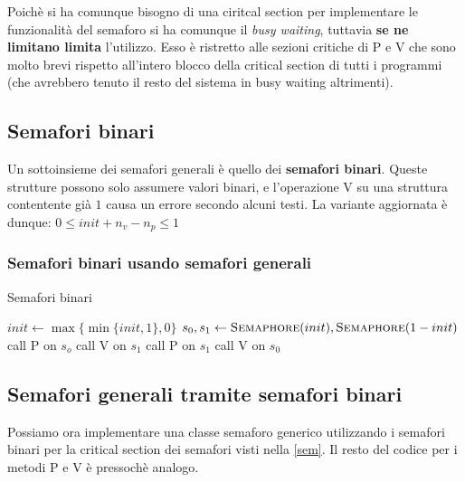 \documentclass{article}
\begin{document}
Poich\`e si ha comunque bisogno di una ciritcal section per implementare le
funzionalit\`a del semaforo si ha comunque il \emph{busy waiting}, tuttavia \textbf{se
ne limitano limita} l'utilizzo. Esso \`e ristretto alle sezioni critiche di \textsc{P}
e \textsc{V} che sono molto brevi rispetto all'intero blocco della critical section
di tutti i programmi (che avrebbero tenuto il resto del sistema in busy waiting
altrimenti).

\subsection{Semafori binari}

Un sottoinsieme dei semafori generali \`e quello dei \textbf{semafori binari}.
Queste strutture possono solo assumere valori binari, e l'operazione \textsc{V}
su una struttura contentente gi\`a $1$ causa un errore secondo alcuni testi.
La variante aggiornata \`e dunque: $0 \leq init + n_v - n_p \leq 1$

\subsubsection{Semafori binari usando semafori generali}

\begin{algorithm}[H]
  \caption{Semafori binari}
  \begin{algorithmic}[0]
      \State $init \gets \max \{ \min \{ init, 1 \}, 0 \}$
      \State $s_0, s_1 \gets \textsc{Semaphore}(init), \textsc{Semaphore}(1-init)$
    \EndProcedure
    \State
      \State call \textsc{P} on $s_o$
      \State call \textsc{V} on $s_1$
    \EndProcedure
    \State
      \State call \textsc{P} on $s_1$
      \State call \textsc{V} on $s_0$
    \EndProcedure
  \end{algorithmic}
\end{algorithm}

\subsection{Semafori generali tramite semafori binari}

Possiamo ora implementare una classe semaforo generico utilizzando i semafori
binari per la critical section dei semafori visti nella \autoref{sem}. Il resto
del codice per i metodi \textsc{P} e \textsc{V} \`e pressoch\`e analogo.
\end{document}
